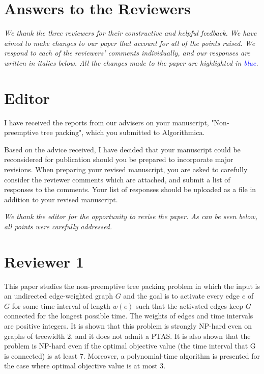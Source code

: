 \documentclass[11pt,a4paper]{article}
\begin{document}
\section*{Answers to the Reviewers}

\textit{We thank the three reviewers for their constructive and helpful feedback. We have aimed to make changes to our paper that account for all of the points raised. We respond to each of the reviewers' comments individually, and our responses are written in italics below. All the changes made to the paper are highlighted in \textcolor{blue}{blue}.}

\section*{Editor}


I have received the reports from our advisers on your manuscript, "Non-preemptive tree packing", which you submitted to Algorithmica.

Based on the advice received, I have decided that your manuscript could be reconsidered for publication should you be prepared to incorporate major revisions.
When preparing your revised manuscript, you are asked to carefully consider the reviewer comments which are attached, and submit a list of responses to the comments. Your list of responses should be uploaded as a file in addition to your revised manuscript.


\textit{We thank the editor for the opportunity to revise the paper. As can be seen below, all points were carefully addressed.}


\section*{Reviewer 1}


This paper studies the non-preemptive tree packing problem in which the input is an undirected edge-weighted graph $G$ and the goal is to activate every edge $e$ of $G$ for some time interval of length $w(e)$ such that the activated edges keep $G$ connected for the longest possible time. The weights of edges and time intervals are positive integers. It is shown that this problem is strongly NP-hard even on graphs of treewidth 2, and it does not admit a PTAS. It is also shown that the problem is NP-hard even if the optimal objective value (the time interval that G is connected) is at least 7. Moreover, a polynomial-time algorithm is presented for the case where optimal objective value is at most 3.
\end{document}
